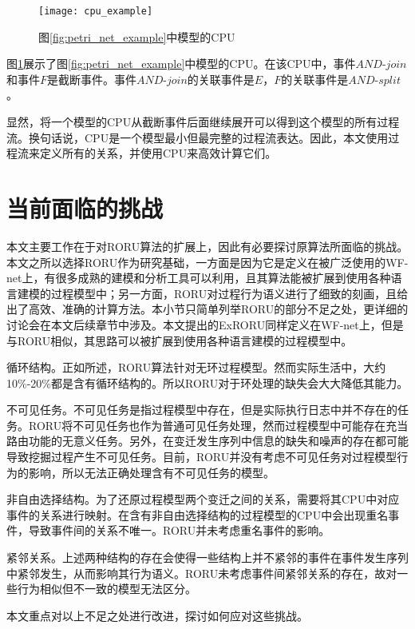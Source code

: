 \begin{figure}[htbp]
  \centering
  \texttt{[image: cpu\_example]}
  \caption{图\ref{fig:petri_net_example}中模型的CPU\label{fig:cpu_example}}
\end{figure}

图\ref{fig:cpu_example}展示了图\ref{fig:petri_net_example}中模型的CPU。在该CPU中，事件$AND$-$join$和事件$F$是截断事件。事件$AND$-$join$的关联事件是$E$，$F$的关联事件是$AND$-$split$。

显然，将一个模型的CPU从截断事件后面继续展开可以得到这个模型的所有过程流。换句话说，CPU是一个模型最小但最完整的过程流表达。因此，本文使用过程流来定义所有的关系，并使用CPU来高效计算它们。

\section{当前面临的挑战}\label{sec:challenge}
本文主要工作在于对RORU算法的扩展上，因此有必要探讨原算法所面临的挑战。本文之所以选择RORU作为研究基础，一方面是因为它是定义在被广泛使用的WF-net上，有很多成熟的建模和分析工具可以利用，且其算法能被扩展到使用各种语言建模的过程模型中；另一方面，RORU对过程行为语义进行了细致的刻画，且给出了高效、准确的计算方法。本小节只简单列举RORU的部分不足之处，更详细的讨论会在本文后续章节中涉及。本文提出的ExRORU同样定义在WF-net上，但是与RORU相似，其思路可以被扩展到使用各种语言建模的过程模型中。

{\heiti 循环结构。}正如所述，RORU算法针对无环过程模型。然而实际生活中，大约10\%-20\%都是含有循环结构的。所以RORU对于环处理的缺失会大大降低其能力。

{\heiti 不可见任务。}不可见任务是指过程模型中存在，但是实际执行日志中并不存在的任务。RORU将不可见任务也作为普通可见任务处理，然而过程模型中可能存在充当路由功能的无意义任务。另外，在变迁发生序列中信息的缺失和噪声的存在都可能导致挖掘过程产生不可见任务。目前，RORU并没有考虑不可见任务对过程模型行为的影响，所以无法正确处理含有不可见任务的模型。

{\heiti 非自由选择结构。}为了还原过程模型两个变迁之间的关系，需要将其CPU中对应事件的关系进行映射。在含有非自由选择结构的过程模型的CPU中会出现重名事件，导致事件间的关系不唯一。RORU并未考虑重名事件的影响。

{\heiti 紧邻关系。}上述两种结构的存在会使得一些结构上并不紧邻的事件在事件发生序列中紧邻发生，从而影响其行为语义。RORU未考虑事件间紧邻关系的存在，故对一些行为相似但不一致的模型无法区分。

本文重点对以上不足之处进行改进，探讨如何应对这些挑战。

